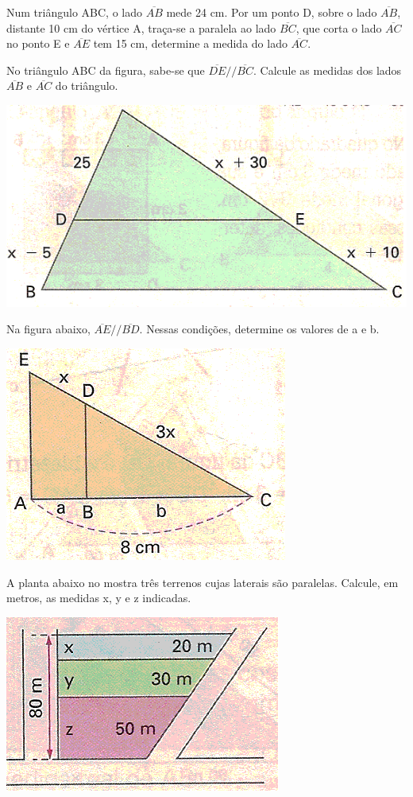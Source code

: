 	\item Num triângulo ABC, o lado $\overline{AB}$ mede 24 cm. Por um ponto D, sobre o lado $\overline{AB}$, distante 10 cm do vértice A, traça-se a paralela ao lado $\overline{BC}$, que corta o lado $\overline{AC}$ no ponto E e $\overline{AE}$ tem 15 cm, determine a medida do lado $\overline{AC}$.
	
	\item No triângulo ABC da figura, sabe-se que $\overline{DE} // \overline{BC}$. Calcule as medidas dos lados $\overline{AB}$ e $\overline{AC}$ do triângulo.
	\begin{center}
	\includegraphics[scale=0.5]{figuras/fig61.png}
	\end{center}
	
	\item Na figura abaixo, $\overline{AE} // \overline{BD}$. Nessas condições, determine os valores de a e b.
	\begin{center}
	\includegraphics[scale=0.5]{figuras/fig62.png}
	\end{center}
	
	\item A planta abaixo no mostra três terrenos cujas laterais são paralelas. Calcule, em metros, as medidas x, y e z indicadas.
	\begin{center}
	\includegraphics[scale=0.5]{figuras/fig63.png}
	\end{center}
	
